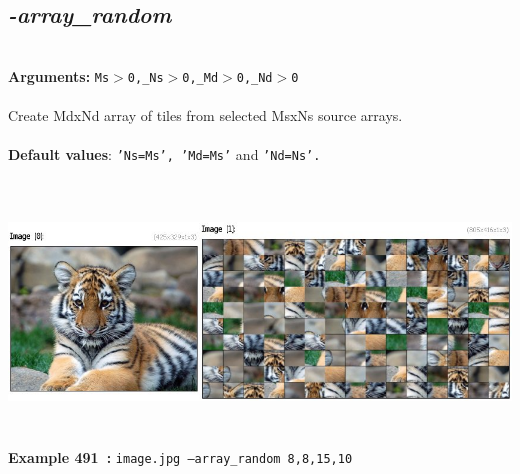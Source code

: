 \documentclass[a4paper,11pt,twoside]{book}
\begin{document}
\subsection{\emph{-array\_random} }\vspace*{-0.5em}
~\\\textbf{Arguments: } 
{\small \texttt{Ms$>$0,\_Ns$>$0,\_Md$>$0,\_Nd$>$0}}\\~\\
Create MdxNd array of tiles from selected MsxNs source arrays.
~\\~\\\textbf{Default values}: {\small \texttt{'Ns=Ms', 'Md=Ms'} and \texttt{'Nd=Ns'.}}
\begin{center}\includegraphics[keepaspectratio=true,height=7cm,width=\textwidth]{img/gmic_def491.jpg}\\
{\footnotesize \textbf{Example 491~:} \texttt{image.jpg --array\_random 8,8,15,10}}
\end{center}
\end{document}
